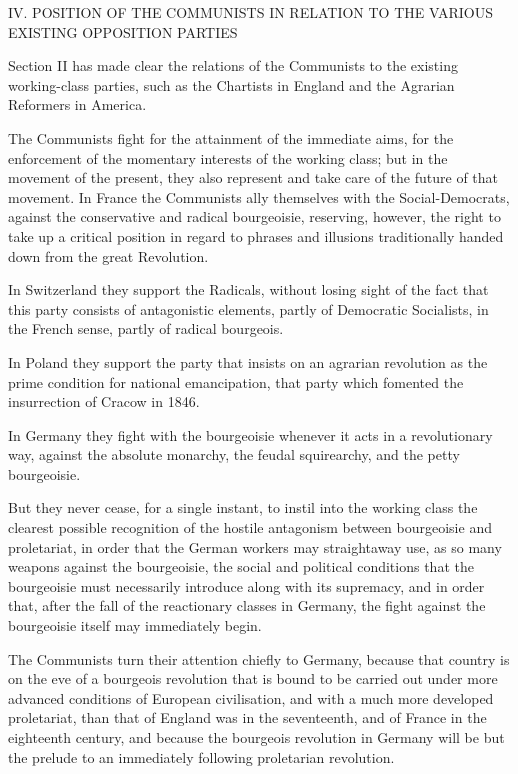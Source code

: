 IV.
POSITION OF THE COMMUNISTS IN RELATION TO THE VARIOUS EXISTING
OPPOSITION PARTIES


Section II has made clear the relations of the Communists to the
existing working-class parties, such as the Chartists in England and
the Agrarian Reformers in America.

The Communists fight for the attainment of the immediate aims, for the
enforcement of the momentary interests of the working class; but in the
movement of the present, they also represent and take care of the
future of that movement. In France the Communists ally themselves with
the Social-Democrats, against the conservative and radical bourgeoisie,
reserving, however, the right to take up a critical position in regard
to phrases and illusions traditionally handed down from the great
Revolution.

In Switzerland they support the Radicals, without losing sight of the
fact that this party consists of antagonistic elements, partly of
Democratic Socialists, in the French sense, partly of radical
bourgeois.

In Poland they support the party that insists on an agrarian revolution
as the prime condition for national emancipation, that party which
fomented the insurrection of Cracow in 1846.

In Germany they fight with the bourgeoisie whenever it acts in a
revolutionary way, against the absolute monarchy, the feudal
squirearchy, and the petty bourgeoisie.

But they never cease, for a single instant, to instil into the working
class the clearest possible recognition of the hostile antagonism
between bourgeoisie and proletariat, in order that the German workers
may straightaway use, as so many weapons against the bourgeoisie, the
social and political conditions that the bourgeoisie must necessarily
introduce along with its supremacy, and in order that, after the fall
of the reactionary classes in Germany, the fight against the
bourgeoisie itself may immediately begin.

The Communists turn their attention chiefly to Germany, because that
country is on the eve of a bourgeois revolution that is bound to be
carried out under more advanced conditions of European civilisation,
and with a much more developed proletariat, than that of England was in
the seventeenth, and of France in the eighteenth century, and because
the bourgeois revolution in Germany will be but the prelude to an
immediately following proletarian revolution.

